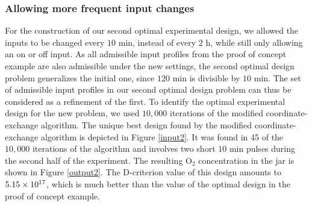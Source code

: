 \subsubsection{Allowing more frequent input changes}
\label{Experiment2}
For the construction of our second optimal experimental design, we allowed the inputs to be changed every $10 \text{ min}$, instead of every $2 \text{ h}$, while still only allowing an on or off input. As all admissible input profiles from the proof of concept example are also admissible under the new settings, the second optimal design problem generalizes the initial one, since $120 \text{ min}$ is divisible by $10 \text{ min}$. The set of admissible input profiles in our second optimal design problem can thus be considered as a refinement of the first. To identify the optimal experimental design for the new problem, we used $10, 000$ iterations of the modified coordinate-exchange algorithm. The unique best design found by the modified coordinate-exchange algorithm is depicted in Figure \ref{input2}. It was found in 45 of the $10, 000$ iterations of the algorithm and involves two short $10 \text{ min}$ pulses during the second half of the experiment. The resulting $\text{O}_2$ concentration in the jar is shown in Figure \ref{output2}. The D-criterion value of this design amounts to {\color{red}$5.15\times 10^{17}$}, which is much better than the value of the optimal design in the proof of concept example.

